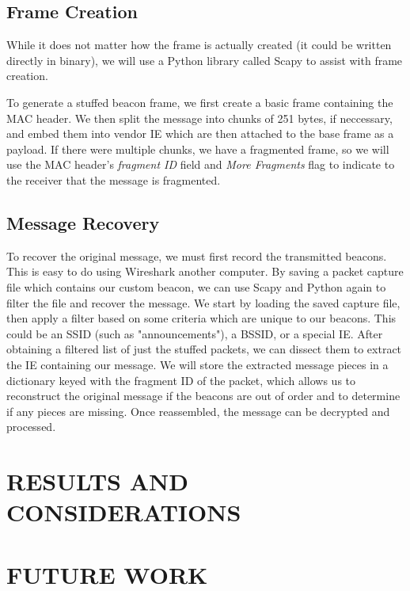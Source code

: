 \documentclass[letterpaper, 10 pt, conference]{ieeeconf}  %
\begin{document}
\subsection{Frame Creation}

While it does not matter how the frame is actually created (it could be written directly in binary), we will use a Python library called Scapy \cite{c4} to assist with frame creation.

To generate a stuffed beacon frame, we first create a basic frame containing the MAC header.  We then split the message into chunks of 251 bytes, if neccessary, and embed them into vendor IE which are then attached to the base frame as a payload.  If there were multiple chunks, we have a fragmented frame, so we will use the MAC header's \textit{fragment ID} field and \textit{More Fragments} flag to indicate to the receiver that the message is fragmented.

\subsection{Message Recovery}

To recover the original message, we must first record the transmitted beacons.  This is easy to do using Wireshark \cite{c6} another computer.  By saving a packet capture file which contains our custom beacon, we can use Scapy and Python again to filter the file and recover the message.  We start by loading the saved capture file, then apply a filter based on some criteria which are unique to our beacons.  This could be an SSID (such as "announcements"), a BSSID, or a special IE.  After obtaining a filtered list of just the stuffed packets, we can dissect them to extract the IE containing our message.  We will store the extracted message pieces in a dictionary keyed with the fragment ID of the packet, which allows us to reconstruct the original message if the beacons are out of order and to determine if any pieces are missing.  Once reassembled, the message can be decrypted and processed.


\section{RESULTS AND CONSIDERATIONS}



\section{FUTURE WORK}
\end{document}
